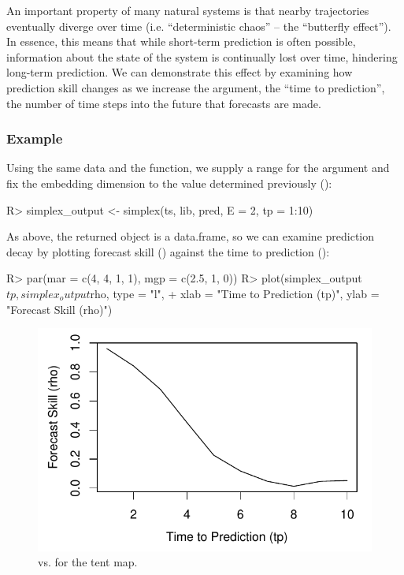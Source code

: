 \documentclass[article]{jss}
\begin{document}
An important property of many natural systems is that nearby trajectories eventually diverge over time (i.e. ``deterministic chaos'' -- the ``butterfly effect''). In essence, this means that while short-term prediction is often possible, information about the state of the system is continually lost over time, hindering long-term prediction. We can demonstrate this effect by examining how prediction skill changes as we increase the  argument, the ``time to prediction'', the number of time steps into the future that forecasts are made.

\subsubsection{Example}\label{sec:prediction-decay-example}

Using the same data and the  function, we supply a range for the  argument and fix the embedding dimension to the value determined previously ():

\begin{Schunk}
\begin{Sinput}
R> simplex_output <- simplex(ts, lib, pred, E = 2, tp = 1:10)
\end{Sinput}
\end{Schunk}

As above, the returned object is a data.frame, so we can examine prediction decay by plotting forecast skill () against the time to prediction ():

\begin{Schunk}
\begin{Sinput}
R> par(mar = c(4, 4, 1, 1), mgp = c(2.5, 1, 0))
R> plot(simplex_output$tp, simplex_output$rho, type = "l",
+       xlab = "Time to Prediction (tp)", ylab = "Forecast Skill (rho)")
\end{Sinput}
\end{Schunk}

\begin{figure}[t!]
\centering
\includegraphics[width=4.5in]{article-simplex-tp}
\caption{\label{fig:simplex-tp}  vs.  for the tent map.}
\end{figure}
\end{document}
